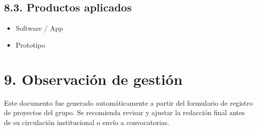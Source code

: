\documentclass[a4paper,12pt]{article}
\begin{document}
\subsection*{8.3. Productos aplicados}
\begin{itemize}
    \item Software / App
    \item Prototipo
\end{itemize}

\section*{9. Observación de gestión}
Este documento fue generado automáticamente a partir del formulario de registro de proyectos del grupo. Se recomienda revisar y ajustar la redacción final antes de su circulación institucional o envío a convocatorias.
\end{document}
